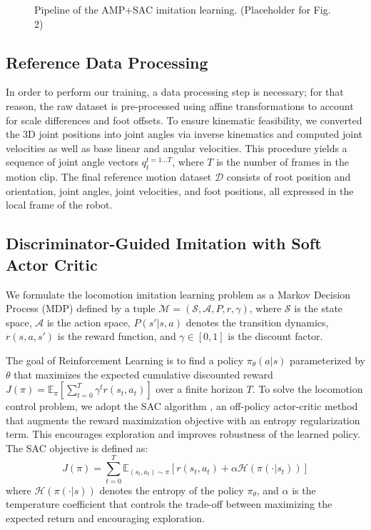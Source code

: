 \documentclass[letterpaper, 10pt, conference]{IEEEtran}
\begin{document}
\begin{figure}[ht]
    \centering
    \caption{Pipeline of the AMP+SAC imitation learning. (Placeholder for Fig. 2)}
    \label{fig:pipeline}
\end{figure}

\subsection{Reference Data Processing}
In order to perform our training, a data processing step is necessary; for that reason, the raw dataset is pre-processed using affine transformations to account for scale differences and foot offsets. To ensure kinematic feasibility, we converted the 3D joint positions into joint angles via inverse kinematics and computed joint velocities as well as base linear and angular velocities. This procedure yields a sequence of joint angle vectors $q_{t}^{t=1\dots T}$, where $T$ is the number of frames in the motion clip. The final reference motion dataset $\mathcal{D}$ consists of root position and orientation, joint angles, joint velocities, and foot positions, all expressed in the local frame of the robot.

\subsection{Discriminator-Guided Imitation with Soft Actor Critic}
We formulate the locomotion imitation learning problem as a Markov Decision Process (MDP) defined by a tuple $\mathcal{M}=(\mathcal{S}, \mathcal{A}, P, r, \gamma)$, where $\mathcal{S}$ is the state space, $\mathcal{A}$ is the action space, $P(s'|s,a)$ denotes the transition dynamics, $r(s,a,s')$ is the reward function, and $\gamma \in [0,1]$ is the discount factor.

The goal of Reinforcement Learning is to find a policy $\pi_{\theta}(a|s)$ parameterized by $\theta$ that maximizes the expected cumulative discounted reward $J(\pi) = \mathbb{E}_{\pi}[\sum_{t=0}^{T}\gamma^{t}r(s_{t},a_{t})]$ over a finite horizon $T$. To solve the locomotion control problem, we adopt the SAC algorithm \cite{Haarnoja2018}, an off-policy actor-critic method that augments the reward maximization objective with an entropy regularization term. This encourages exploration and improves robustness of the learned policy. The SAC objective is defined as:
\begin{equation}
J(\pi)=\sum_{t=0}^{T}\mathbb{E}_{(s_{t},a_{t})\sim\pi}[r(s_{t},a_{t})+\alpha\mathcal{H}(\pi(\cdot|s_{t}))]
\end{equation}
where $\mathcal{H}(\pi(\cdot|s))$ denotes the entropy of the policy $\pi_{\theta}$, and $\alpha$ is the temperature coefficient that controls the trade-off between maximizing the expected return and encouraging exploration.
\end{document}
